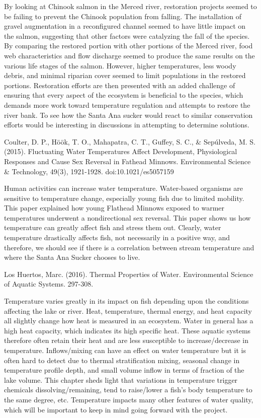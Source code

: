 \documentclass{article}
\begin{document}
By looking at Chinook salmon in the Merced river, restoration projects seemed to be failing to prevent the Chinook population from falling. The installation of gravel augmentation in a reconfigured channel seemed to have little impact on the salmon, suggesting that other factors were catalyzing the fall of the species. By comparing the restored portion with other portions of the Merced river, food web characteristics and flow discharge seemed to produce the same results on the various life stages of the salmon. However, higher temperatures, less woody debris, and minimal riparian cover seemed to limit populations in the restored portions. Restoration efforts are then presented with an added challenge of ensuring that every aspect of the ecosystem is beneficial to the species, which demands more work toward temperature regulation and attempts to restore the river bank. To see how the Santa Ana sucker would react to similar conservation efforts would be interesting in discussions in attempting to determine solutions. 

Coulter, D. P., Höök, T. O., Mahapatra, C. T., Guffey, S. C., \& Sepúlveda, M. S. (2015). Fluctuating Water Temperatures Affect Development, Physiological Responses and Cause Sex Reversal in Fathead Minnows. Environmental Science \& Technology, 49(3), 1921-1928. doi:10.1021/es5057159

Human activities can increase water temperature. Water-based organisms are sensitive to temperature change, especially young fish due to limited mobility. This paper explained how young Flathead Minnows exposed to warmer temperatures underwent a nondirectional sex reversal. This paper shows us how temperature can greatly affect fish and stress them out. Clearly, water temperature drastically affects fish, not necessarily in a positive way, and therefore, we should see if there is a correlation between stream temperature and where the Santa Ana Sucker chooses to live.

Los Huertos, Marc. (2016). Thermal Properties of Water. Environmental Science of Aquatic Systems. 297-308.

Temperature varies greatly in its impact on fish depending upon the conditions affecting the lake or river. Heat, temperature, thermal energy, and heat capacity all slightly change how heat is measured in an ecosystem. Water in general has a high heat capacity, which indicates its high specific heat. These aquatic systems therefore often retain their heat and are less susceptible to increase/decrease in temperature. Inflows/mixing can have an effect on water temperature but it is often hard to detect due to thermal stratification mixing, seasonal change in temperature profile depth, and small volume inflow in terms of fraction of the lake volume. This chapter sheds light that variations in temperature trigger chemicals dissolving/remaining, tend to raise/lower a fish’s body temperature to the same degree, etc. Temperature impacts many other features of water quality, which will be important to keep in mind going forward with the project.
\end{document}
